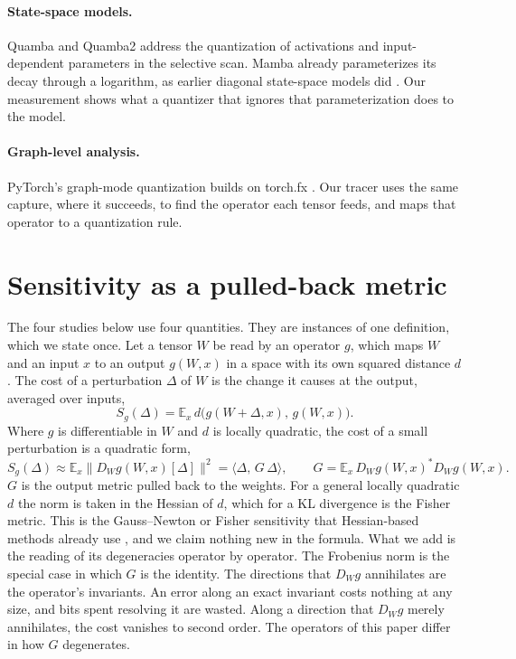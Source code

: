 \documentclass[10pt]{article}
\begin{document}
\paragraph{State-space models.} Quamba \citep{chiang2025quamba} and Quamba2
\citep{chiang2025quamba2} address the quantization of activations and input-dependent
parameters in the selective scan. Mamba \citep{gu2024mamba} already parameterizes its decay
through a logarithm, as earlier diagonal state-space models did \citep{gu2022s4d}. Our
measurement shows what a quantizer that ignores that parameterization does to the model.

\paragraph{Graph-level analysis.} PyTorch's graph-mode quantization builds on torch.fx
\citep{reed2022torchfx}. Our tracer uses the same capture, where it succeeds, to find the operator each tensor
feeds, and maps that operator to a quantization rule.

\section{Sensitivity as a pulled-back metric}\label{sec:pullback}

The four studies below use four quantities. They are instances of one definition, which we state
once. Let a tensor $W$ be read by an operator $g$, which maps $W$ and an input $x$ to an output
$g(W,x)$ in a space with its own squared distance $d$. The cost of a perturbation $\Delta$ of $W$
is the change it causes at the output, averaged over inputs,
\begin{equation}
S_g(\Delta) = \mathbb{E}_x\, d\bigl(g(W+\Delta,x),\, g(W,x)\bigr).
\label{eq:cost}
\end{equation}
Where $g$ is differentiable in $W$ and $d$ is locally quadratic, the cost of a small perturbation
is a quadratic form,
\begin{equation}
S_g(\Delta) \approx \mathbb{E}_x \bigl\| D_W g(W,x)[\Delta] \bigr\|^2 = \langle \Delta,\, G\,\Delta\rangle,
\qquad G = \mathbb{E}_x\, D_Wg(W,x)^{*} D_Wg(W,x).
\label{eq:pullback}
\end{equation}
$G$ is the output metric pulled back to the weights. For a general locally quadratic $d$ the norm
is taken in the Hessian of $d$, which for a KL divergence is the Fisher metric. This is the
Gauss--Newton or Fisher sensitivity that Hessian-based methods already use
\citep{dong2019hawq,frantar2023gptq}, and we claim nothing new in the formula. What we add is the
reading of its degeneracies operator by operator. The Frobenius norm is the special case in
which $G$ is the identity. The directions that $D_Wg$ annihilates are the operator's invariants.
An error along an exact invariant costs nothing at any size, and bits spent resolving it are
wasted. Along a direction that $D_Wg$ merely annihilates, the cost vanishes to second order. The operators of
this paper differ in how $G$ degenerates.
\end{document}
